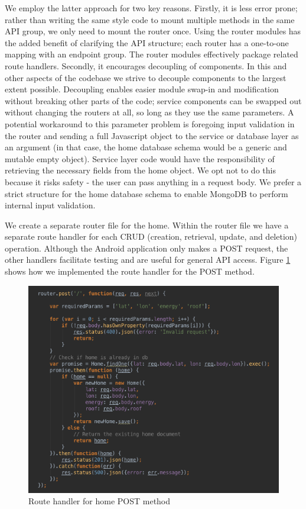 \documentclass[pageno]{jpaper}
\begin{document}
We employ the latter approach for two key reasons. Firstly, it is less error prone; rather than writing the same style code to mount multiple methods in the same API group, we only need to mount the router once. Using the router modules has the added benefit of clarifying the API structure; each router has a one-to-one mapping with an endpoint group. The router modules effectively package related route handlers. Secondly, it encourages decoupling of components. In this and other aspects of the codebase we strive to decouple components to the largest extent possible. Decoupling enables easier module swap-in and modification without breaking other parts of the code; service components can be swapped out without changing the routers at all, so long as they use the same parameters. A potential workaround to this parameter problem is foregoing input validation in the router and sending a full Javascript object to the service or database layer as an argument (in that case, the home database schema would be a generic and mutable empty object). Service layer code would have the responsibility of retrieving the necessary fields from the home object. We opt not to do this because it risks safety - the user can pass anything in a request body. We prefer a strict structure for the home database schema to enable MongoDB to perform internal input validation.

We create a separate router file for the home. Within the router file we have a separate route handler for each CRUD (creation, retrieval, update, and deletion) operation. Although the Android application only makes a POST request, the other handlers facilitate testing and are useful for general API access. Figure \ref{fig:postrouter} shows how we implemented the route handler for the POST method.

\begin{figure}[h]
\begin{center}
\includegraphics[scale=0.5] {postrouter}
\caption{Route handler for home POST method}
\label{fig:postrouter}
\end{center}
\end{figure}
\end{document}
